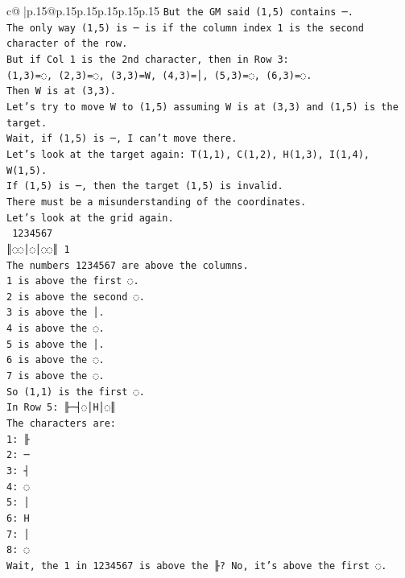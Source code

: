 \documentclass{article}
\begin{document}
{\begin{supertabular}{c@{$\;$}|p{.15\linewidth}@{}p{.15\linewidth}p{.15\linewidth}p{.15\linewidth}p{.15\linewidth}p{.15\linewidth}}
{{{\texttt{But the GM said (1,5) contains ─.} \\
\texttt{The only way (1,5) is ─ is if the column index 1 is the second character of the row.} \\
\texttt{But if Col 1 is the 2nd character, then in Row 3:} \\
\texttt{(1,3)=◌, (2,3)=◌, (3,3)=W, (4,3)=│, (5,3)=◌, (6,3)=◌.} \\
\texttt{Then W is at (3,3).} \\
\texttt{Let's try to move W to (1,5) assuming W is at (3,3) and (1,5) is the target.} \\
\texttt{Wait, if (1,5) is ─, I can't move there.} \\
\texttt{Let's look at the target again: T(1,1), C(1,2), H(1,3), I(1,4), W(1,5).} \\
\texttt{If (1,5) is ─, then the target (1,5) is invalid.} \\
\texttt{There must be a misunderstanding of the coordinates.} \\
\texttt{Let's look at the grid again.} \\
\texttt{ 1234567} \\
\texttt{║◌◌│◌│◌◌║ 1} \\
\texttt{The numbers 1234567 are above the columns.} \\
\texttt{1 is above the first ◌.} \\
\texttt{2 is above the second ◌.} \\
\texttt{3 is above the │.} \\
\texttt{4 is above the ◌.} \\
\texttt{5 is above the │.} \\
\texttt{6 is above the ◌.} \\
\texttt{7 is above the ◌.} \\
\texttt{So (1,1) is the first ◌.} \\
\texttt{In Row 5: ╟─┤◌│H│◌║} \\
\texttt{The characters are:} \\
\texttt{1: ╟} \\
\texttt{2: ─} \\
\texttt{3: ┤} \\
\texttt{4: ◌} \\
\texttt{5: │} \\
\texttt{6: H} \\
\texttt{7: │} \\
\texttt{8: ◌} \\
\texttt{Wait, the 1 in 1234567 is above the ╟? No, it's above the first ◌.} \\
}}}
\end{supertabular}}
\end{document}

